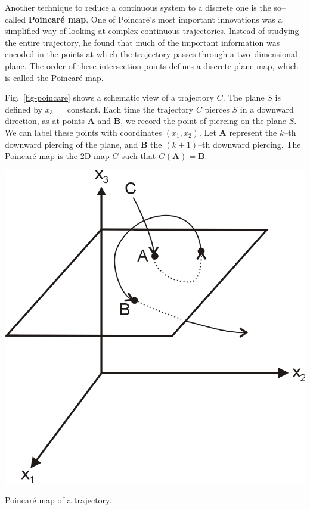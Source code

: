 Another technique to reduce a continuous system to a discrete one is the so--called \textbf{Poincar\'{e} map}. One of Poincar\'{e}'s most important innovations was a simplified way of looking at complex continuous trajectories. Instead of studying the entire trajectory, he found that much of the important information was encoded in the points at which the trajectory passes through a two--dimensional plane. The order of these intersection points defines a discrete plane map, which is called the Poincar\'{e} map. 

Fig.~\ref{fig-poincare} shows a schematic view of a trajectory $C$. The plane $S$ is defined by $x_3=$ constant. Each time the trajectory $C$ pierces $S$ in a downward direction, as at points ${\mathbf A}$ and ${\mathbf B}$, we record the point of piercing on the plane $S$. We can label these points with coordinates $(x_1,x_2)$. Let ${\mathbf A}$ represent the $k$--th downward piercing of the plane, and ${\mathbf B}$ the $(k+1)$--th downward piercing. The Poincar\'{e} map is the 2D map $G$ such that $G({\mathbf A}) = {\mathbf B}$.

\begin{marginfigure}
\centering
\includegraphics{dynamic/figures/poincare}
\caption{Poincar\'{e} map of a trajectory.}
\label{fig-poincare}
\end{marginfigure} 

